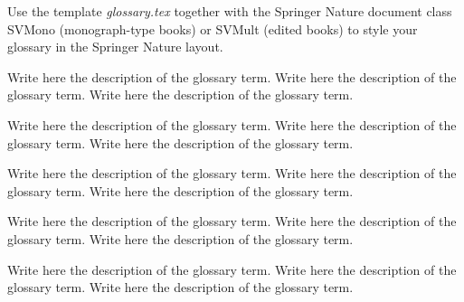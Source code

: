 

Use the template \emph{glossary.tex} together with the Springer Nature document class SVMono (monograph-type books) or SVMult (edited books) to style your glossary in the Springer Nature layout.


 Write here the description of the glossary term. Write here the description of the glossary term. Write here the description of the glossary term.

 Write here the description of the glossary term. Write here the description of the glossary term. Write here the description of the glossary term.

 Write here the description of the glossary term. Write here the description of the glossary term. Write here the description of the glossary term.

 Write here the description of the glossary term. Write here the description of the glossary term. Write here the description of the glossary term.

 Write here the description of the glossary term. Write here the description of the glossary term. Write here the description of the glossary term.